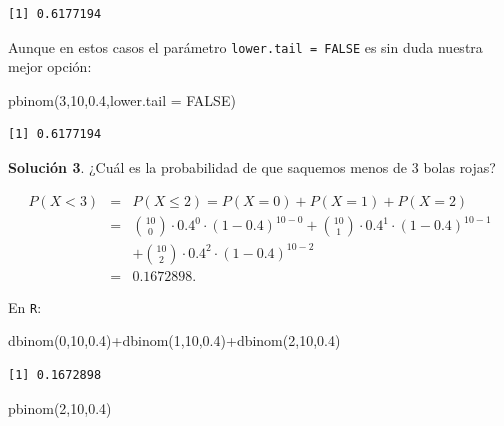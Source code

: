 \documentclass[
  letterpaper,
  DIV=11,
  numbers=noendperiod]{scrreprt}
\newenvironment{Shaded}{\begin{snugshade}}{\end{snugshade}}
\newcommand{\AttributeTok}[1]{\textcolor[rgb]{0.40,0.45,0.13}{#1}}
\newcommand{\ConstantTok}[1]{\textcolor[rgb]{0.56,0.35,0.01}{#1}}
\newcommand{\DecValTok}[1]{\textcolor[rgb]{0.68,0.00,0.00}{#1}}
\newcommand{\FloatTok}[1]{\textcolor[rgb]{0.68,0.00,0.00}{#1}}
\newcommand{\FunctionTok}[1]{\textcolor[rgb]{0.28,0.35,0.67}{#1}}
\newcommand{\NormalTok}[1]{\textcolor[rgb]{0.00,0.23,0.31}{#1}}
\newcommand{\SpecialCharTok}[1]{\textcolor[rgb]{0.37,0.37,0.37}{#1}}
\begin{document}
\begin{verbatim}
[1] 0.6177194
\end{verbatim}

Aunque en estos casos el parámetro \texttt{lower.tail\ =\ FALSE} es sin
duda nuestra mejor opción:

\begin{Shaded}
\begin{Highlighting}[]
\FunctionTok{pbinom}\NormalTok{(}\DecValTok{3}\NormalTok{,}\DecValTok{10}\NormalTok{,}\FloatTok{0.4}\NormalTok{,}\AttributeTok{lower.tail =} \ConstantTok{FALSE}\NormalTok{)}
\end{Highlighting}
\end{Shaded}

\begin{verbatim}
[1] 0.6177194
\end{verbatim}

\textbf{Solución 3}. ¿Cuál es la probabilidad de que saquemos menos de
\(3\) bolas rojas?

\begin{eqnarray*}
P(X< 3)&=& P(X\leq 2)=  P(X=0)+P(X=1)+P(X=2)\\
&=& 
{10\choose 0}\cdot 0.4^0\cdot (1-0.4)^{10-0}+ {10\choose 1}\cdot 0.4^1\cdot (1-0.4)^{10-1}\\
&&+
{10\choose 2}\cdot 0.4^2\cdot (1-0.4)^{10-2}\\
&=&0.1672898.
\end{eqnarray*}

En \texttt{R}:

\begin{Shaded}
\begin{Highlighting}[]
\FunctionTok{dbinom}\NormalTok{(}\DecValTok{0}\NormalTok{,}\DecValTok{10}\NormalTok{,}\FloatTok{0.4}\NormalTok{)}\SpecialCharTok{+}\FunctionTok{dbinom}\NormalTok{(}\DecValTok{1}\NormalTok{,}\DecValTok{10}\NormalTok{,}\FloatTok{0.4}\NormalTok{)}\SpecialCharTok{+}\FunctionTok{dbinom}\NormalTok{(}\DecValTok{2}\NormalTok{,}\DecValTok{10}\NormalTok{,}\FloatTok{0.4}\NormalTok{)}
\end{Highlighting}
\end{Shaded}

\begin{verbatim}
[1] 0.1672898
\end{verbatim}

\begin{Shaded}
\begin{Highlighting}[]
\FunctionTok{pbinom}\NormalTok{(}\DecValTok{2}\NormalTok{,}\DecValTok{10}\NormalTok{,}\FloatTok{0.4}\NormalTok{)}
\end{Highlighting}
\end{Shaded}
\end{document}
